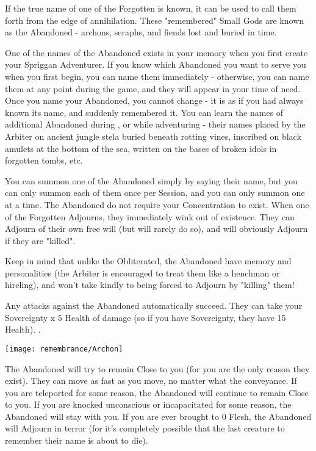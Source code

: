 
If the true name of one of the Forgotten is known, it can be used to call them forth from the edge of annihilation. These "remembered" Small Gods are known as the Abandoned - archons, seraphs, and fiends lost and buried in time. 

One of the names of the Abandoned exists in your memory when you first create your Spriggan Adventurer. If you know which Abandoned you want to serve you when you first begin, you can name them immediately - otherwise, you can name them at any point during the game, and they will appear in your time of need. Once you name your Abandoned, you cannot change - it is as if you had always known its name, and suddenly remembered it.  You can learn the names of additional Abandoned during , or while adventuring - their names placed by the Arbiter on ancient jungle stela buried beneath rotting vines, inscribed on black amulets at the bottom of the sea, written on the bases of broken idols in forgotten tombs, etc.

You can summon one of the Abandoned simply by saying their name, but you can only summon each of them once per Session, and you can only summon one at a time. The Abandoned do not require your Concentration to exist. When one of the Forgotten Adjourns, they immediately wink out of existence.   They can Adjourn of their own free will (but will rarely do so), and will obviously Adjourn if they are "killed". 

\cbreak

Keep in mind that unlike the Obliterated, the Abandoned have memory and personalities (the Arbiter is encouraged to treat them like a henchman or hireling), and won't take kindly to being forced to Adjourn by "killing" them!

Any attacks against the Abandoned automatically succeed. They can take your \MAX Sovereignty x 5 Health of damage (so if you have  Sovereignty, they have 15 Health). .

\begin{center}
\texttt{[image: remembrance/Archon]}
\end{center}

The Abandoned will try to remain Close to you (for you are the only reason they exist). They can move as fast as you move, no matter what the conveyance. If you are teleported for some reason, the Abandoned will continue to remain Close to you.  If you are knocked unconscious or incapacitated for some reason, the Abandoned will stay with you. If you are ever brought to 0 Flesh, the Abandoned will Adjourn in terror (for it's completely possible that the last creature to remember their name is about to die).


